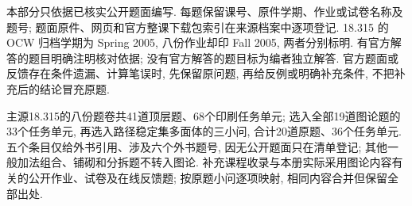 \label{chap:course-assessments}
本部分只依据已核实公开题面编写. 每题保留课号、原件学期、作业或试卷名称及题号;
题面原件、网页和官方整课下载包索引在来源档案中逐项登记.
18.315 的 OCW 归档学期为 Spring 2005, 八份作业却印 Fall 2005, 两者分别标明.
有官方解答的题目明确注明核对依据; 没有官方解答的题目标为编者独立解答.
官方题面或反馈存在条件遗漏、计算笔误时, 先保留原问题, 再给反例或明确补充条件,
不把补充后的结论冒充原题.

主源18.315的八份题卷共41道顶层题、68个印刷任务单元;
选入全部19道图论题的33个任务单元, 再选入路径稳定集多面体的三小问,
合计20道原题、36个任务单元. 五个条目仅给外书引用、涉及六个外书题号,
因无公开题面只在清单登记; 其他一般加法组合、铺砌和分拆题不转入图论.
补充课程收录与本册实际采用图论内容有关的公开作业、试卷及在线反馈题;
按原题小问逐项映射, 相同内容合并但保留全部出处.












